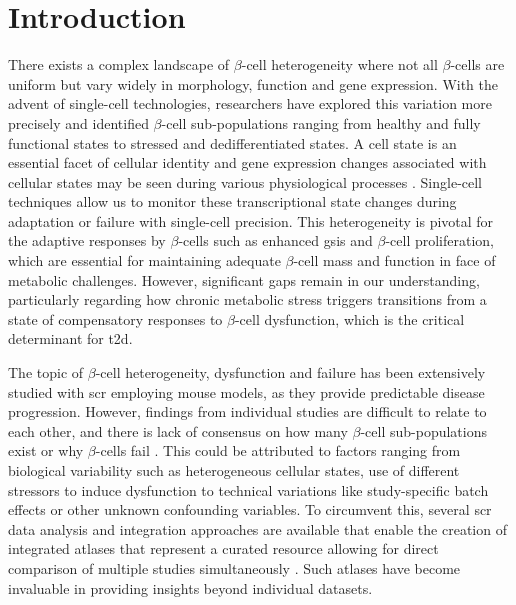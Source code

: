 \section{Introduction}
\label{sec:chp3_intro}
\par There exists a complex landscape of $\beta$-cell heterogeneity where not all $\beta$-cells are uniform but vary widely in morphology, function and gene expression. With the advent of single-cell technologies, researchers have explored this variation more precisely and identified $\beta$-cell sub-populations ranging from healthy and fully functional states to stressed and dedifferentiated states. A cell state is an essential facet of cellular identity and gene expression changes associated with cellular states may be seen during various physiological processes \textbf{\cite{morris_evolving_2019,zeng_what_2022}}. Single-cell techniques allow us to monitor these transcriptional state changes during adaptation or failure with single-cell precision. This heterogeneity is pivotal for the adaptive responses by $\beta$-cells such as enhanced \acrfull{gsis} and $\beta$-cell proliferation, which are essential for maintaining adequate $\beta$-cell mass and function in face of metabolic challenges. However, significant gaps remain in our understanding, particularly regarding how chronic metabolic stress triggers transitions from a state of compensatory responses to $\beta$-cell dysfunction, which is the critical determinant for \gls{t2d}.\\ 

\par The topic of $\beta$-cell heterogeneity, dysfunction and failure has been extensively studied with \acrfull{scr} employing mouse models, as they provide predictable disease progression. However, findings from individual studies are difficult to relate to each other, and there is lack of consensus on how many $\beta$-cell sub-populations exist or why $\beta$-cells fail \textbf{\cite{liu_all_2017,miranda_pancreatic_2021}}. This could be attributed to factors ranging from biological variability such as heterogeneous cellular states, use of different stressors to induce dysfunction to technical variations like study-specific batch effects or other unknown confounding variables. To circumvent this, several \gls{scr} data analysis and integration approaches are available that enable the creation of integrated atlases that represent a curated resource allowing for direct comparison of multiple studies simultaneously \textbf{\cite{luecken_benchmarking_2021}}. Such atlases have become invaluable in providing insights beyond individual datasets.\\

